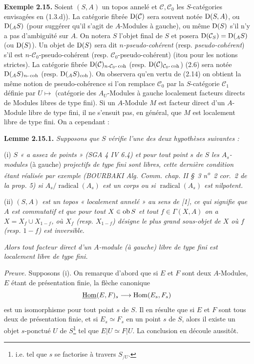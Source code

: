 \documentclass[11pt]{article}
\begin{document}
\textbf{Exemple 2.15.} Soient \((S,A)\) un topos annelé et \(\mathcal C,\mathcal C_0\) les \(S\)-catégories envisagées en (1.3.d)). La catégorie fibrée \(\mathrm D(\mathcal C)\) sera souvent notée \(\mathrm D(S,A)\), ou \(\mathrm D({}_A S)\) (pour
suggérer qu'il s'agit de \(A\)-Modules à gauche), ou même \(\mathrm D(S)\) s'il n'y a pas d'ambiguïté sur \(A\). On notera \(S\) l'objet final de \(S\) et posera \(\mathrm D(\mathcal C_S)=\mathrm D({}_A S)\) (ou \(\mathrm D(S)\)). Un objet de \(\mathrm D(S)\) sera dit \emph{\(n\)-pseudo-cohérent} (resp. \emph{pseudo-cohérent}) s'il est \(n\)-\(\mathcal C_0\)-pseudo-cohérent (resp. \(\mathcal C_0\)-pseudo-cohérent) (itou pour les notions strictes). La catégorie fibrée \(\mathrm D(\mathcal C)_{n\text{-}\mathcal C_0\text{-}\operatorname{coh}}\) (resp. \(\mathrm D(\mathcal C)_{\mathcal C_0\text{-}\operatorname{coh}}\)) (2.6) sera notée \(\mathrm D({}_A S)_{n\text{-}\operatorname{coh}}\) (resp. \(\mathrm D({}_A S)_{\operatorname{coh}}\)). On observera qu'en vertu de (2.14) on obtient la même notion de pseudo-cohérence si l'on remplace \(\mathcal C_0\) par la \(S\)-catégorie \(\mathcal C_1\) définie par \(U\longmapsto\) (catégorie des \(A_U\)-Modules à gauche localement facteurs directs de Modules libres de type fini). Si un \(A\)-Module \(M\) est facteur direct d'un \(A\)-Module libre de type fini, il ne s'ensuit pas, en général, que \(M\) est localement libre de type fini. On a cependant :

\textbf{Lemme 2.15.1.} \emph{Supposons que \(S\) vérifie l'une des deux hypothèses suivantes :}

(i) \emph{\(S\) « a assez de points » (SGA 4 IV 6.4) et pour tout point \(s\) de \(S\) les \(A_s\)-modules} (à gauche) \emph{projectifs de type fini sont libres, cette dernière condition étant réalisée par exemple (BOURBAKI Alg. Comm. chap. II \S~3 n\textsuperscript{o}~2 cor.~2 de la prop. 5) si \(A_s/\operatorname{radical}(A_s)\) est un corps ou si \(\operatorname{radical}(A_s)\) est nilpotent.}

(ii) \emph{\((S,A)\) est un topos « localement annelé » au sens de [1], ce qui signifie que \(A\) est commutatif et que pour tout \(X\in\operatorname{ob} S\) et tout \(f\in\Gamma(X,A)\) on a \(X=X_f\cup X_{1-f}\), où \(X_f\) (resp. \(X_{1-f}\)) désigne le plus grand sous-objet de \(X\) où \(f\) (resp. \(1-f\)) est inversible.}

\emph{Alors tout facteur direct d'un \(A\)-module (à gauche) libre de type fini est localement libre de type fini.}

\emph{Preuve.} Supposons (i). On remarque d'abord que si \(E\) et \(F\) sont deux \(A\)-Modules, \(E\) étant de présentation finie, la flèche canonique
\[
  \underline{\operatorname{Hom}}(E,F)_s\longrightarrow\operatorname{Hom}(E_s,F_s)
\]
est un
isomorphisme pour tout point \(s\) de \(S\). Il en résulte que si \(E\) et \(F\) sont tous deux de présentation finie, et si \(E_s\simeq F_s\) en un point \(s\) de \(S\), alors il existe un objet \(s\)-ponctué \(U\) de \(S\)\footnote{i.e. tel que \(s\) se factorise à travers \(S_{/U}\).} tel que \(E|U\simeq F|U\). La conclusion en découle aussitôt.
\end{document}
